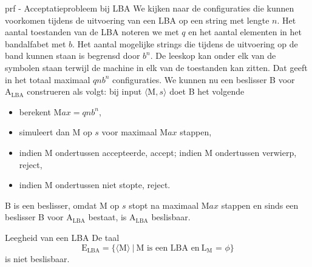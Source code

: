 \begin{prf}{prf - Acceptatieprobleem bij LBA}
    We kijken naar de configuraties die kunnen voorkomen tijdens de uitvoering van een LBA op een string met lengte $n$. Het aantal toestanden van de LBA noteren we met $q$ en het aantal elementen in het bandalfabet met $b$. Het aantal mogelijke strings die tijdens de uitvoering op de band kunnen staan is begrensd door $b^n$. De leeskop kan onder elk van de symbolen staan terwijl de machine in elk van de toestanden kan zitten. Dat geeft in het totaal maximaal $qnb^n$ configuraties. We kunnen nu een beslisser B voor $\text{A}_{\text{LBA}}$ construeren als volgt: bij input $\langle \text{M}, s \rangle$ doet B het volgende 
    \begin{itemize}
        \item berekent $\text{M}ax = qnb^n$,
        \item simuleert dan M op $s$ voor maximaal $\text{M}ax$ stappen, \item indien M ondertussen accepteerde, accept; indien M ondertussen verwierp, reject,
        \item indien M ondertussen niet stopte, reject.
    \end{itemize}
    B is een beslisser, omdat M op $s$ stopt na maximaal $\text{M}ax$ stappen en sinds een beslisser B voor $\text{A}_{\text{LBA}}$ bestaat, is $\text{A}_{\text{LBA}}$ beslisbaar.
\end{prf}

\begin{lem}{Leegheid van een LBA}
    De taal 
    \begin{equation*}
        \text{E}_{\text{LBA}} = \{\langle \text{M} \rangle \ | \ \text{M is een LBA en} \ \text{L$_{\text{M}}$ = $\phi$} \}
    \end{equation*}
    is niet beslisbaar.
\end{lem}

